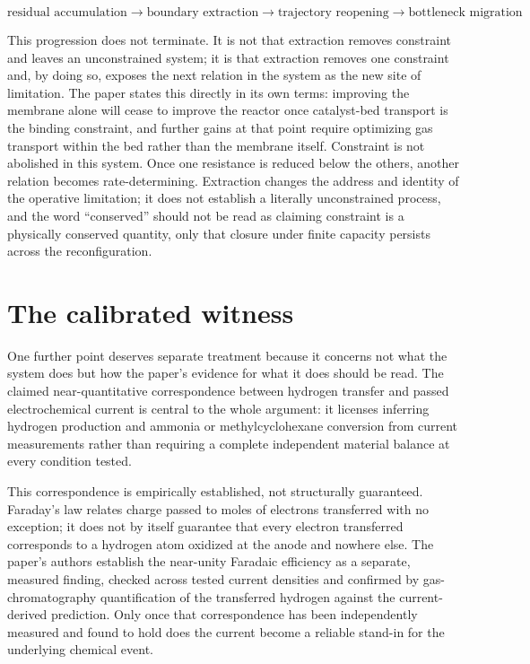 \documentclass[11pt]{article}
\begin{document}
\[
\text{residual accumulation} \rightarrow \text{boundary extraction} \rightarrow \text{trajectory reopening} \rightarrow \text{bottleneck migration}
\]

This progression does not terminate. It is not that extraction removes constraint and leaves an unconstrained system; it is that extraction removes one constraint and, by doing so, exposes the next relation in the system as the new site of limitation. The paper states this directly in its own terms: improving the membrane alone will cease to improve the reactor once catalyst-bed transport is the binding constraint, and further gains at that point require optimizing gas transport within the bed rather than the membrane itself. Constraint is not abolished in this system. Once one resistance is reduced below the others, another relation becomes rate-determining. Extraction changes the address and identity of the operative limitation; it does not establish a literally unconstrained process, and the word ``conserved'' should not be read as claiming constraint is a physically conserved quantity, only that closure under finite capacity persists across the reconfiguration.

\section{The calibrated witness}

One further point deserves separate treatment because it concerns not what the system does but how the paper's evidence for what it does should be read. The claimed near-quantitative correspondence between hydrogen transfer and passed electrochemical current is central to the whole argument: it licenses inferring hydrogen production and ammonia or methylcyclohexane conversion from current measurements rather than requiring a complete independent material balance at every condition tested.

This correspondence is empirically established, not structurally guaranteed. Faraday's law relates charge passed to moles of electrons transferred with no exception; it does not by itself guarantee that every electron transferred corresponds to a hydrogen atom oxidized at the anode and nowhere else. The paper's authors establish the near-unity Faradaic efficiency as a separate, measured finding, checked across tested current densities and confirmed by gas-chromatography quantification of the transferred hydrogen against the current-derived prediction. Only once that correspondence has been independently measured and found to hold does the current become a reliable stand-in for the underlying chemical event.
\end{document}
